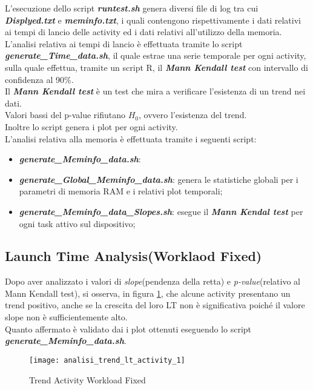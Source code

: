 L'esecuzione dello script \textbf{\textit{runtest.sh}} genera diversi file di log
tra cui \textit{\textbf{Displyed.txt}} e \textit{\textbf{meminfo.txt}}, i quali
contengono rispettivamente i dati relativi ai tempi di lancio delle activity ed
i dati relativi all'utilizzo della memoria.\\
L'analisi relativa ai tempi di lancio è effettuata tramite lo script \textbf{\textit{generate\_Time\_data.sh}},
il quale estrae una serie temporale per ogni activity, sulla quale effettua,
tramite un script R, il \textbf{\textit{Mann Kendall test}} con intervallo
di confidenza al 90\%.\\
Il \textbf{\textit{Mann Kendall test}} è un test che mira a verificare l'esistenza
di un trend nei dati.\\
Valori bassi del p-value rifiutano $H_0$, ovvero l'esistenza del trend.\\
Inoltre lo script genera i plot per ogni activity.\\
L'analisi relativa alla memoria è effettuata tramite i seguenti script:
\begin{itemize}
  \item \textit{\textbf{generate\_Meminfo\_data.sh}}:
  \item \textit{\textbf{generate\_Global\_Meminfo\_data.sh}}: genera le statistiche
  globali per i parametri di memoria RAM e i relativi plot temporali;
  \item \textit{\textbf{generate\_Meminfo\_data\_Slopes.sh}}: esegue il \textbf{\textit{Mann Kendal test}}
  per ogni task attivo sul dispositivo;
\end{itemize}

\clearpage

\subsection{Launch Time Analysis(Worklaod Fixed)}
Dopo aver analizzato i valori di \textit{slope}(pendenza della retta) e
\textit{p-value}(relativo al Mann Kendall test), si osserva, in figura \ref{analisi_trend_lt_activity_1},
che alcune activity presentano un trend positivo, anche se la crescita
del loro LT non è significativa poiché il valore slope non è sufficientemente
alto.\\
Quanto affermato è validato dai i plot ottenuti eseguendo lo script
\textit{\textbf{generate\_Meminfo\_data.sh}}.

\begin{figure}[!htbp]
  \centering
  \texttt{[image: analisi\_trend\_lt\_activity\_1]}
  \caption{Trend Activity Workload Fixed}
  \label{analisi_trend_lt_activity_1}
\end{figure}

